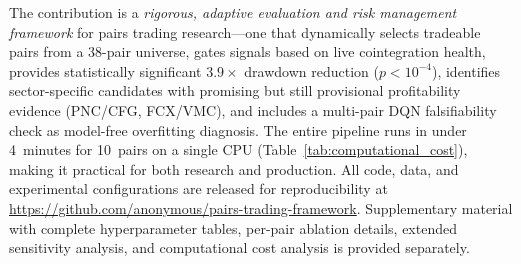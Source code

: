 \documentclass{ieeeaccess}
\begin{document}
The contribution is a \emph{rigorous, adaptive evaluation and risk management framework} for pairs trading research---one that dynamically selects tradeable pairs from a 38-pair universe, gates signals based on live cointegration health, provides statistically significant $3.9\times$ drawdown reduction ($p < 10^{-4}$), identifies sector-specific candidates with promising but still provisional profitability evidence (PNC/CFG, FCX/VMC), and includes a multi-pair DQN falsifiability check as model-free overfitting diagnosis.
The entire pipeline runs in under 4~minutes for 10~pairs on a single CPU (Table~\ref{tab:computational_cost}), making it practical for both research and production.
All code, data, and experimental configurations are released for reproducibility at \url{https://github.com/anonymous/pairs-trading-framework}.
Supplementary material with complete hyperparameter tables, per-pair ablation details, extended sensitivity analysis, and computational cost analysis is provided separately.



\end{document}
